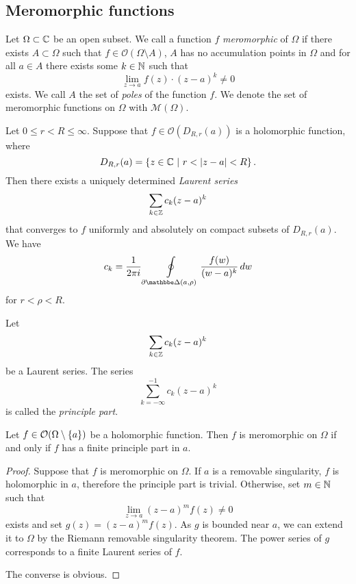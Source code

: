\newpage

\subsection{Meromorphic functions}


\begin{definicija}
Let $\Omega \subset \mathbb{C}$ be an open subset. We call a function $f$
\emph{meromorphic} of $\Omega$ if there
exists $A \subset \Omega$ such that
$f \in \mathcal{O}(\Omega \setminus A)$, $A$ has no accumulation
points in $\Omega$ and for all $a \in A$ there exists some
$k \in \mathbb{N}$ such that
\[
\lim_{z \to a} f(z) \cdot (z-a)^k \ne 0
\]
exists. We call $A$ the set of \emph{poles} of the
function $f$. We denote the set of meromorphic functions on
$\Omega$ with $\mathcal{M}(\Omega)$.
\end{definicija}

\begin{izrek}
Let $0 \leq r < R \leq \infty$. Suppose that
$f \in \mathcal{O}(D_{R,r}(a))$ is a holomorphic function, where
\[
D_{R,r}(a) = \left\{z \in \mathbb{C}~\middle\vert~r < \left\lvert z-a\right\rvert < R\right\}.
\]
Then there exists a uniquely determined
\emph{Laurent series}
\[
\sum_{k \in \mathbb{Z}} c_k (z-a)^k
\]
that converges to $f$ uniformly and absolutely on compact subsets
of $D_{R,r}(a)$. We have
\[
c_k = \frac{1}{2 \pi i} \olint_{\partial \dsk(a, \rho)}
\frac{f(w)}{(w - a)^k}\,dw
\]
for $r < \rho < R$.
\end{izrek}

\begin{definicija}
Let
\[
\sum_{k \in \mathbb{Z}} c_k (z-a)^k
\]
be a Laurent series. The series
\[
\sum_{k=-\infty}^{-1} c_k (z-a)^k
\]
is called the \emph{principle part}.
\end{definicija}

\begin{lema}
Let $f \in \mathcal{O}(\Omega \setminus \left\{a\right\})$ be a holomorphic
function. Then $f$ is meromorphic on $\Omega$ if and only if $f$
has a finite principle part in $a$.
\end{lema}

\begin{proof}
Suppose that $f$ is meromorphic on $\Omega$. If $a$ is a removable
singularity, $f$ is holomorphic in $a$, therefore the principle
part is trivial. Otherwise, set $m \in \mathbb{N}$ such that
\[
\lim_{z \to a} (z-a)^m f(z) \ne 0
\]
exists and set $g(z) = (z-a)^m f(z)$. As $g$ is bounded near $a$,
we can extend it to $\Omega$ by the Riemann removable singularity
theorem. The power series of $g$ corresponds to a finite Laurent
series of $f$.

The converse is obvious.
\end{proof}

